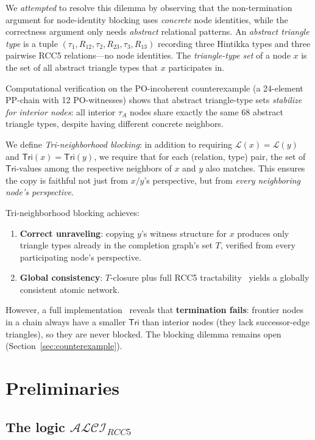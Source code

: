 \documentclass[a4paper,11pt]{article}
\theoremstyle{definition}
\newcommand{\ALCIRCC}[1]{\ensuremath{\mathcal{ALCI}_{\mathit{RCC#1}}}}
\newcommand{\Tri}{\ensuremath{\mathsf{Tri}}}
\newcommand{\LL}{\ensuremath{\mathcal{L}}}
\begin{document}
We \emph{attempted} to resolve this dilemma by observing that
the non-termination argument for node-identity blocking uses
\emph{concrete} node identities, while the correctness argument
only needs \emph{abstract} relational patterns.
An \emph{abstract triangle type} is a tuple
$(\tau_1, R_{12}, \tau_2, R_{23}, \tau_3, R_{13})$ recording
three Hintikka types and three pairwise RCC5 relations---no
node identities.  The \emph{triangle-type set} of a node $x$
is the set of all abstract triangle types that $x$ participates
in.

Computational verification on the PO-incoherent counterexample
(a 24-element PP-chain with 12 PO-witnesses) shows that abstract
triangle-type sets \emph{stabilize for interior nodes}: all
interior $\tau_A$ nodes share exactly the same 68 abstract
triangle types, despite having different concrete neighbors.

We define \emph{Tri-neighborhood blocking}:
in addition to requiring $\LL(x) = \LL(y)$ and
$\Tri(x) = \Tri(y)$, we require that for each
(relation, type) pair, the set of $\Tri$-values among
the respective neighbors of $x$ and $y$ also matches.
This ensures the copy is faithful not just from $x/y$'s
perspective, but from \emph{every neighboring node's
perspective}.

Tri-neighborhood blocking achieves:
\begin{enumerate}[nosep]
  \item \textbf{Correct unraveling}: copying $y$'s witness
    structure for $x$ produces only triangle types already in
    the completion graph's set $T$, verified from every
    participating node's perspective.
  \item \textbf{Global consistency}: $T$-closure plus full
    RCC5 tractability~\cite{RenzNebel1999,Renz1999} yields a
    globally consistent atomic network.
\end{enumerate}
However, a full implementation~\cite{NonTermScript} reveals
that \textbf{termination fails}: frontier nodes in a
chain always have a smaller $\Tri$ than interior nodes
(they lack successor-edge triangles), so they are never
blocked.  The blocking dilemma remains open
(Section~\ref{sec:counterexample}).


\section{Preliminaries}\label{sec:prelim}

\subsection{The logic $\ALCIRCC{5}$}
\end{document}
